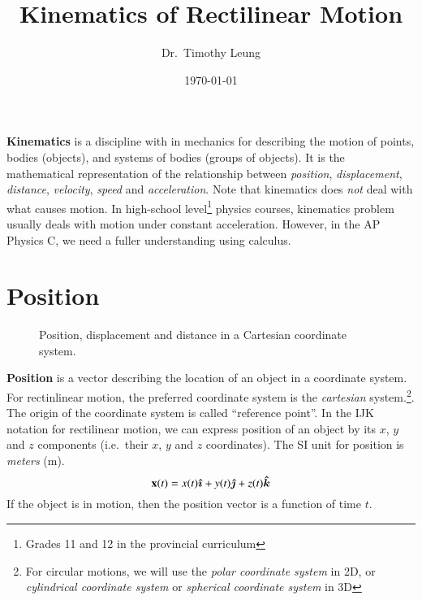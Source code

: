 \documentclass{../../../oss-handout}
\title{Kinematics of Rectilinear Motion}
\author{Dr.\ Timothy Leung}
\date{\today}
\newcommand{\mb}[1]{\ensuremath\mathbf{#1}}
\begin{document}
\thispagestyle{title}
\gentitle

\textbf{Kinematics} is a discipline with in mechanics for describing the
motion of points, bodies (objects), and systems of  bodies (groups of objects).
It is the mathematical representation of the relationship between
\emph{position}, \emph{displacement}, \emph{distance}, \emph{velocity},
\emph{speed} and \emph{acceleration}. Note that kinematics does \emph{not}
deal with what causes motion. In high-school level\footnote{Grades 11 and 12 in
  the provincial curriculum} physics courses, kinematics problem usually deals
with motion under constant acceleration. However, in the AP Physics C, we need
a fuller understanding using calculus.

\section{Position}

\begin{wrapfigure}{r}{.35\textwidth}
  \centering
  \vspace{-.1in}
  \caption{Position, displacement and distance in a Cartesian coordinate
    system.}
  \label{fig:d-vs-d}
\end{wrapfigure}
\textbf{Position} is a vector describing the location of an object in a
coordinate system. For rectinlinear motion, the preferred coordinate system
is the \emph{cartesian} system.\footnote{For circular motions, we will use
  the \emph{polar coordinate system} in 2D, or
  \emph{cylindrical coordinate system} or \emph{spherical coordinate system} in
  3D}. The origin of the coordinate system is called ``reference point''.  In
the IJK notation for rectilinear motion, we can express position of an object
by its $x$, $y$ and $z$ components (i.e.\ their $x$, $y$ and $z$ coordinates).
The SI unit for position is \emph{meters} (\si{\metre}).
\begin{equation*}
  \mb{x}(t)=x(t)\bm{\hat{\imath}} + y(t)\bm{\hat{\jmath}} + z(t)\bm{\hat{k}}
\end{equation*}
If the object is in motion, then the position vector is a function of time $t$.
\end{document}
